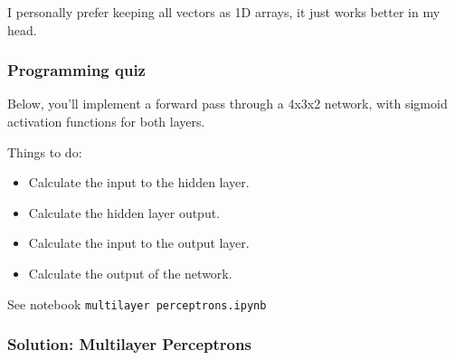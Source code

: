 I personally prefer keeping all vectors as 1D arrays, it just works better in my head.

\subsubsection{Programming quiz}

Below, you'll implement a forward pass through a 4x3x2 network, with sigmoid activation functions for both layers.

Things to do:

\begin{itemize}
    \item Calculate the input to the hidden layer.
    \item Calculate the hidden layer output.
    \item Calculate the input to the output layer.
    \item Calculate the output of the network.
\end{itemize}

See notebook \verb|multilayer perceptrons.ipynb|

\subsubsection{Solution: Multilayer Perceptrons}

